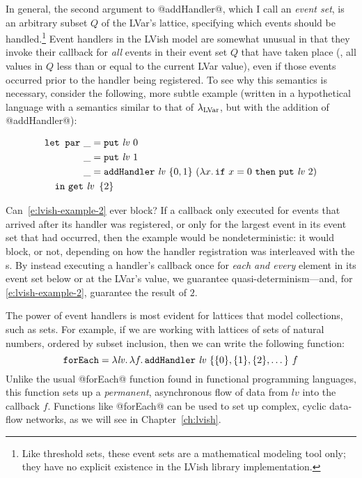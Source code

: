 In general, the second argument to @addHandler@, which I call an
\emph{event set}, is an arbitrary subset $Q$ of the LVar's lattice,
specifying which events should be handled.\footnote{Like threshold
  sets, these event sets are a mathematical modeling tool only; they
  have no explicit existence in the LVish library implementation.}
Event handlers in the LVish model are somewhat unusual in that they
invoke their callback for \emph{all} events in their event set $Q$
that have taken place (\ie, all values in $Q$ less than or equal to
the current LVar value), even if those events occurred prior to the
handler being registered.  To see why this semantics is necessary,
consider the following, more subtle example (written in a hypothetical
language with a semantics similar to that of $\lambda_{\textrm{LVar}}$, but with
the addition of @addHandler@):

\singlespacing
\begin{equation}
\begin{split}
& \LETPAR ~\_ = \putexp{\mathit{lv}}{0} \\
&  \letparspace ~\_ = \putexp{\mathit{lv}}{1} \\
&  \letparspace ~\_ = \ADDHANDLER~\mathit{lv}~\{ 0, 1 \}~
     (\lam{x}{\termfont{if}~x=0~\termfont{then}~\putexp{\mathit{lv}}{2}}) \\
&  \letspace \IN~ \getexp{\mathit{lv}}{\setof{2}}
\end{split}
\label{e:lvish-example-2}
\end{equation}
\doublespacing

Can~\ref{e:lvish-example-2} ever block?  If a callback only executed
for events that arrived after its handler was registered, or only for
the largest event in its event set that had occurred, then the
example would be nondeterministic: it would block, or not, depending
on how the handler registration was interleaved with the
s.  By instead executing a handler's callback once for
\emph{each and every} element in its event set below or at the LVar's
value, we guarantee quasi-determinism---and, for
\ref{e:lvish-example-2}, guarantee the result of $2$.

The power of event handlers is most evident for lattices that model
collections, such as sets.  For example, if we are working with
lattices of sets of natural numbers, ordered by subset inclusion, then
we can write the following function:
\[
\termfont{forEach} = \lam{\mathit{lv}}{
  \lam{f}{
    \ADDHANDLER~\mathit{lv}~\{ \{0\}, \{1\}, \{2\}, \dots \}~f
  }}
\]
Unlike the usual @forEach@ function found in functional programming
languages, this function sets up a \emph{permanent}, asynchronous flow
of data from $\mathit{lv}$ into the callback $f$.  Functions like
@forEach@ can be used to set up complex, cyclic data-flow networks, as
we will see in Chapter~\ref{ch:lvish}.

